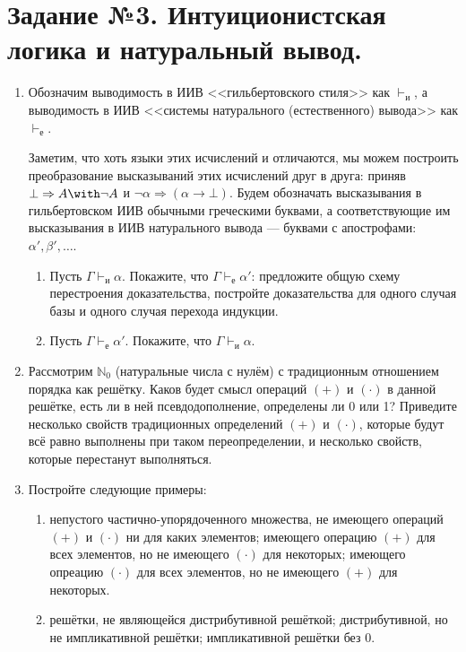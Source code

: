 \documentclass[10pt,a4paper,oneside]{article}
\begin{document}
\section*{Задание №3. Интуиционистская логика и натуральный вывод.}
\begin{enumerate}
\item Обозначим выводимость в ИИВ <<гильбертовского стиля>> как $\vdash_\text{и}$, 
а выводимость в ИИВ <<системы натурального (естественного) вывода>> как $\vdash_\text{е}$.

Заметим, что хоть языки этих исчислений и отличаются, мы можем построить преобразование 
высказываний этих исчислений друг в друга: приняв $\bot \Rightarrow A\with\neg A$ и $\neg \alpha \Rightarrow (\alpha\rightarrow\bot)$.
Будем обозначать высказывания в гильбертовском ИИВ обычными греческими буквами,
а соответствующие им высказывания в ИИВ натурального вывода --- 
буквами с апострофами: $\alpha', \beta', \dots$.

\begin{enumerate}
\item Пусть $\Gamma\vdash_\text{и}\alpha$. Покажите, что $\Gamma\vdash_\text{е}\alpha'$: предложите общую схему 
перестроения доказательства, постройте доказательства для одного случая базы и одного случая перехода индукции.
\item Пусть $\Gamma\vdash_\text{е}\alpha'$. Покажите, что $\Gamma\vdash_\text{и}\alpha$. 
\end{enumerate}

\item Рассмотрим $\mathbb{N}_0$ (натуральные числа с нулём) с традиционным отношением порядка как решётку.
Каков будет смысл операций $(+)$ и $(\cdot)$ в данной решётке, есть ли в ней псевдодополнение, 
определены ли 0 или 1? Приведите несколько свойств традиционных определений $(+)$ и $(\cdot)$, 
которые будут всё равно выполнены при таком переопределении, и несколько свойств, которые перестанут выполняться.

\item Постройте следующие примеры:
\begin{enumerate}
\item непустого частично-упорядоченного множества, не имеющего операций $(+)$ и $(\cdot)$ ни для каких элементов;
имеющего операцию $(+)$ для всех элементов, но не имеющего $(\cdot)$ для некоторых;
имеющего опреацию $(\cdot)$ для всех элементов, но не имеющего $(+)$ для некоторых.
\item решётки, не являющейся дистрибутивной решёткой;
 дистрибутивной, но не импликативной решётки; импликативной решётки без 0.
\end{enumerate}


\end{enumerate}
\end{document}
